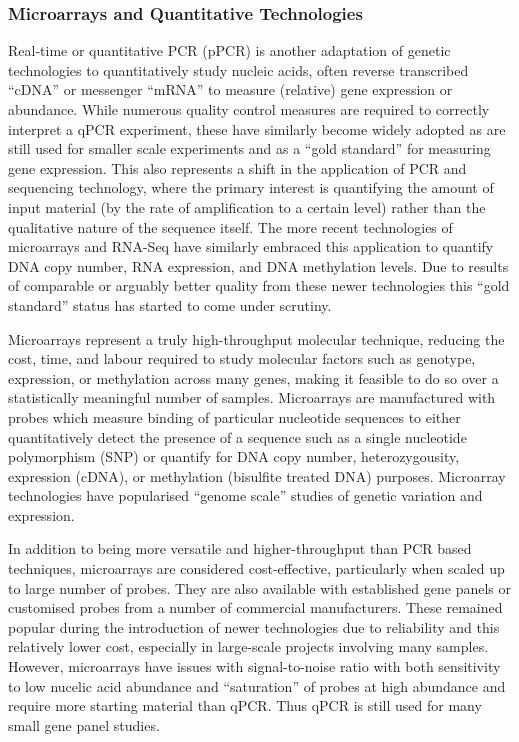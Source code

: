 \subsubsection{Microarrays and Quantitative Technologies}
Real-time or quantitative PCR (pPCR) is another adaptation of genetic technologies to quantitatively study nucleic acids, often reverse transcribed ``cDNA'' or messenger ``mRNA'' to measure (relative) gene expression or abundance. While numerous quality control measures are required to correctly interpret a qPCR experiment, these have similarly become widely adopted as are still used for smaller scale experiments and as a ``gold standard'' for measuring gene expression. This also represents a shift in the application of PCR and sequencing technology, where the primary interest is quantifying the amount of input material (by the rate of amplification to a certain level) rather than the qualitative nature of the sequence itself. The more recent technologies of microarrays and RNA-Seq have similarly embraced this application to quantify DNA copy number, RNA expression, and DNA methylation levels. Due to results of comparable or arguably better quality from these newer technologies this ``gold standard'' status has started to come under scrutiny.

Microarrays represent a truly high-throughput molecular technique, reducing the cost, time, and labour required to study molecular factors such as genotype, expression, or methylation across many genes, making it feasible to do so over a statistically meaningful number of samples. Microarrays are manufactured with probes which measure binding of particular nucleotide sequences to either quantitatively detect the presence of a sequence such as a single nucleotide polymorphism (SNP) or quantify for DNA copy number, heterozygousity, expression (cDNA), or methylation (bisulfite treated DNA) purposes. Microarray technologies have popularised ``genome scale'' studies of genetic variation and expression.

In addition to being more versatile and higher-throughput than PCR based techniques, microarrays are considered cost-effective, particularly when scaled up to large number of probes. They are also available with established gene panels or customised probes from a number of commercial manufacturers. These remained popular during the introduction of newer technologies due to reliability and this relatively lower cost, especially in large-scale projects involving many samples. However, microarrays have issues with signal-to-noise ratio with both sensitivity to low nucelic acid abundance and ``saturation'' of probes at high abundance and require more starting material than qPCR. Thus qPCR is still used for many small gene panel studies.

